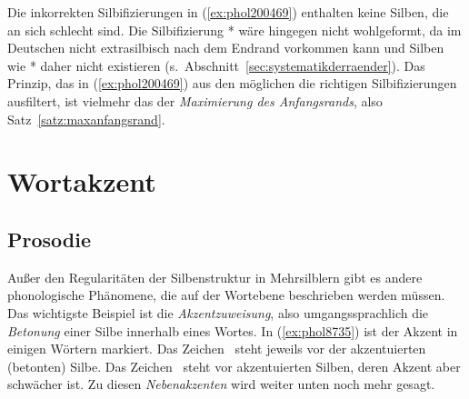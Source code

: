 Die inkorrekten Silbifizierungen in (\ref{ex:phol200469}) enthalten keine Silben, die an sich schlecht sind.
Die Silbifizierung *\textipa{[kOmpl.Et]} wäre hingegen nicht wohlgeformt, da \textipa{[l]} im Deutschen nicht extrasilbisch nach dem Endrand vorkommen kann und Silben wie *\textipa{[kOmpl]} daher nicht existieren (s.\ Abschnitt~\ref{sec:systematikderraender}).
Das Prinzip, das in (\ref{ex:phol200469}) aus den möglichen die richtigen Silbifizierungen ausfiltert, ist vielmehr das der \textit{Maximierung des Anfangsrands}, also Satz~\ref{satz:maxanfangsrand}.



\section{Wortakzent}

\label{sec:wortakzent}

\subsection{Prosodie}

\label{sec:prosodie}


Außer den Regularitäten der Silbenstruktur in Mehrsilblern gibt es andere phonologische Phänomene, die auf der Wortebene beschrieben werden müssen.
Das wichtigste Beispiel ist die \textit{Akzentzuweisung}, also umgangssprachlich die \textit{Betonung} einer Silbe innerhalb eines Wortes.
In (\ref{ex:phol8735}) ist der Akzent in einigen Wörtern markiert.
Das Zeichen \Akz\ steht jeweils vor der akzentuierten (betonten) Silbe.
Das Zeichen \Nakz\ steht vor akzentuierten Silben, deren Akzent aber schwächer ist.
Zu diesen \textit{Nebenakzenten} wird weiter unten noch mehr gesagt.

